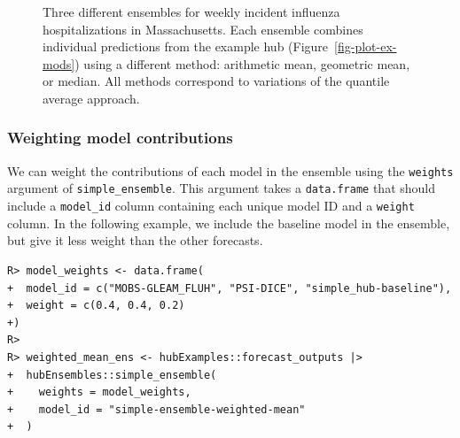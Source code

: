 \documentclass[
  article,
  shortnames,
  notitle]{jss}
\begin{document}
\begin{figure}[H]


\caption{\label{fig-plot-ensembles}Three different ensembles for weekly
incident influenza hospitalizations in Massachusetts. Each ensemble
combines individual predictions from the example hub
(Figure~\ref{fig-plot-ex-mods}) using a different method: arithmetic
mean, geometric mean, or median. All methods correspond to variations of
the quantile average approach.}

\end{figure}%

\subsubsection{Weighting model
contributions}\label{weighting-model-contributions}

We can weight the contributions of each model in the ensemble using the
\texttt{weights} argument of \texttt{simple\_ensemble}. This argument
takes a \texttt{data.frame} that should include a \texttt{model\_id}
column containing each unique model ID and a \texttt{weight} column. In
the following example, we include the baseline model in the ensemble,
but give it less weight than the other forecasts.

\begin{verbatim}
R> model_weights <- data.frame(
+  model_id = c("MOBS-GLEAM_FLUH", "PSI-DICE", "simple_hub-baseline"),
+  weight = c(0.4, 0.4, 0.2)
+)
R> 
R> weighted_mean_ens <- hubExamples::forecast_outputs |>
+  hubEnsembles::simple_ensemble(
+    weights = model_weights,
+    model_id = "simple-ensemble-weighted-mean"
+  )
\end{verbatim}
\end{document}
